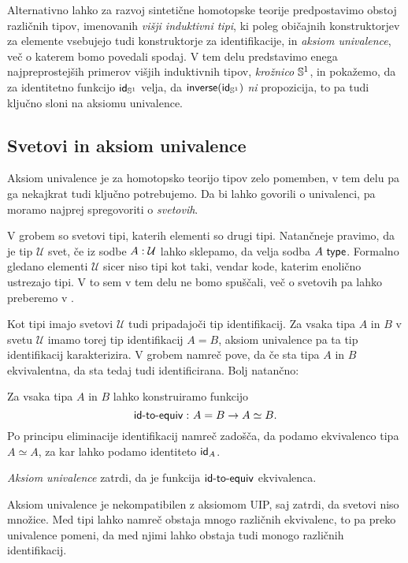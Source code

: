 Alternativno lahko za razvoj sintetične homotopske teorije predpostavimo obstoj različnih tipov, imenovanih \emph{višji induktivni tipi}, ki poleg običajnih konstruktorjev za elemente vsebujejo tudi konstruktorje za identifikacije, in \emph{aksiom univalence}, več o katerem bomo povedali spodaj. V tem delu predstavimo enega najpreprostejših primerov višjih induktivnih tipov, \emph{krožnico} \(\mathbb{S}^{1}\), in pokažemo, da za identitetno funkcijo \(\textnormal{\textsf{id}}_{\mathbb{S}^{1}}\) velja, da \(\textnormal{\textsf{inverse}}(\textnormal{\textsf{id}}_{\mathbb{S}^{1}})\) \emph{ni} propozicija, to pa tudi ključno sloni na aksiomu univalence.

\subsection{Svetovi in aksiom univalence}

Aksiom univalence je za homotopsko teorijo tipov zelo pomemben, v tem delu pa ga nekajkrat tudi ključno potrebujemo. Da bi lahko govorili o univalenci, pa moramo najprej spregovoriti o \emph{svetovih}.

V grobem so svetovi tipi, katerih elementi so drugi tipi. Natančneje pravimo, da je tip \(\mathcal{U}\) svet, če iz sodbe \({A : \mathcal{U}}\) lahko sklepamo, da velja sodba \(A\ \textnormal{\textsf{type}}\). Formalno gledano elementi \(\mathcal{U}\) sicer niso tipi kot taki, vendar kode, katerim enolično ustrezajo tipi. V to sem v tem delu ne bomo spuščali, več o svetovih pa lahko preberemo v \cite[Poglavje I.6]{rijke2022introduction}.

Kot tipi imajo svetovi \(\mathcal{U}\) tudi pripadajoči tip identifikacij. Za vsaka tipa \(A\) in \(B\) v svetu \(\mathcal{U}\) imamo torej tip identifikacij \(A = B\), aksiom univalence pa ta tip identifikacij karakterizira. V grobem namreč pove, da če sta tipa \(A\) in \(B\) ekvivalentna, da sta tedaj tudi identificirana. Bolj natančno:

\begin{definicija}
  Za vsaka tipa \(A\) in \(B\) lahko konstruiramo funkcijo
  \[\textnormal{\textsf{id-to-equiv}} \,\colon A = B \to A \simeq B.\]
  Po principu eliminacije identifikacij namreč zadošča, da podamo ekvivalenco tipa \(A \simeq A\), za kar lahko podamo identiteto \(\textnormal{\textsf{id}}_{A}\).

  \emph{Aksiom univalence} zatrdi, da je funkcija \(\textnormal{\textsf{id-to-equiv}}\) ekvivalenca.
\end{definicija}

Aksiom univalence je nekompatibilen z aksiomom UIP, saj zatrdi, da svetovi niso množice. Med tipi lahko namreč obstaja mnogo različnih ekvivalenc, to pa preko univalence pomeni, da med njimi lahko obstaja tudi monogo različnih identifikacij.

